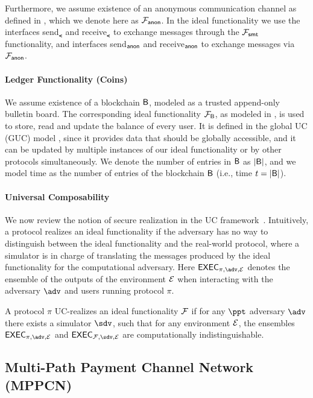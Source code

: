 Furthermore, we assume existence of an anonymous communication channel as defined in 
\cite{cl}, which we denote here as $\mathcal{F}_{\mathsf{anon}}$. In the ideal functionality we use the 
interfaces send$_\smt$ and receive$_\smt$ to exchange messages through the $\mathcal{F}_{\mathsf{smt}}$ 
functionality, and interfaces send$_{\mathsf{anon}}$ and receive$_{\mathsf{anon}}$ to exchange messages via 
$\mathcal{F}_{\mathsf{anon}}$.

\paragraph{Ledger Functionality (Coins)}
We assume existence of a blockchain $\mathsf{B}$, modeled as a trusted append-only bulletin board. 
The corresponding ideal functionality $\mathcal{F}_{\mathsf{B}}$, as modeled in \cite{perun}, is used to 
store, read and update the balance of every user. It is defined in the global UC (GUC) model 
\cite{guc}, since it provides data that should be globally accessible, and it can be updated 
by multiple instances of our ideal functionality or by other protocols simultaneously. We 
denote the number of entries in $\mathsf{B}$ as $|\mathsf{B}|$, and we model time as the number of entries 
of the blockchain $\mathsf{B}$ (i.e., time $t = |\mathsf{B}|$).

\paragraph{Universal Composability}
We now review the notion of secure realization in the UC framework~\cite{canetti}. 
Intuitively, a protocol realizes an ideal functionality if the adversary has no way 
to distinguish between the ideal functionality and the real-world protocol, where 
a simulator is in charge of translating the messages produced by the ideal functionality 
for the computational adversary. Here $\exec_{\pi, \adv, \dist}$ denotes the ensemble of 
the outputs of the environment $\mathcal{E}$ when interacting with the adversary $\adv$ and 
users running protocol $\pi$.

\begin{definition}
A protocol $\pi$ UC-realizes an ideal functionality $\mathcal{F}$ if for any $\ppt$ adversary 
$\adv$ there exists a simulator $\sdv$, such that for any environment $\mathcal{E}$, the 
ensembles $\exec_{\pi, \adv, \dist}$ and $\exec_{\FF, \sdv, \dist}$ are computationally 
indistinguishable.
\end{definition}

\subsection{Multi-Path Payment Channel Network (MPPCN)}
\label{sec:mppcn}

